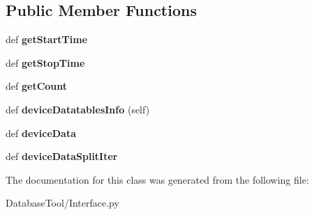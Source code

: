\subsection*{Public Member Functions}
\begin{DoxyCompactItemize}
\item 
\mbox{\label{classMIS_1_1DatabaseTool_1_1Interface_1_1Cormis__DataReader__Interface_af492daa30ec68c35eff04792d9e08d13}} 
def {\bfseries get\+Start\+Time}
\item 
\mbox{\label{classMIS_1_1DatabaseTool_1_1Interface_1_1Cormis__DataReader__Interface_a42bee0622b0fd33790905046e36df09b}} 
def {\bfseries get\+Stop\+Time}
\item 
\mbox{\label{classMIS_1_1DatabaseTool_1_1Interface_1_1Cormis__DataReader__Interface_afab751abe5c61ddcff5cf3febdc6d82c}} 
def {\bfseries get\+Count}
\item 
\mbox{\label{classMIS_1_1DatabaseTool_1_1Interface_1_1Cormis__DataReader__Interface_a43f91e5e2d638cf6200e5c92d7b20d7e}} 
def {\bfseries device\+Datatables\+Info} (self)
\item 
\mbox{\label{classMIS_1_1DatabaseTool_1_1Interface_1_1Cormis__DataReader__Interface_a36927f9ffdbca77a7e3dd9744d5d6f93}} 
def {\bfseries device\+Data}
\item 
\mbox{\label{classMIS_1_1DatabaseTool_1_1Interface_1_1Cormis__DataReader__Interface_ac2cf56a9f734af1430b6544e92c05d28}} 
def {\bfseries device\+Data\+Split\+Iter}
\end{DoxyCompactItemize}


The documentation for this class was generated from the following file\+:\begin{DoxyCompactItemize}
\item 
Database\+Tool/Interface.\+py\end{DoxyCompactItemize}
